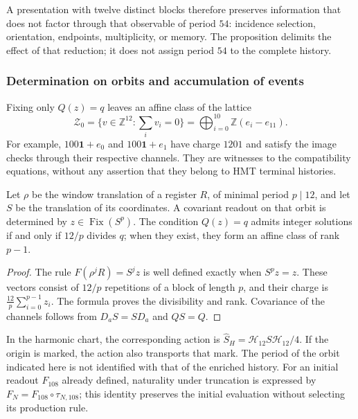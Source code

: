 A presentation with twelve distinct blocks therefore preserves
information that does not factor through that observable of period $54$:
incidence selection, orientation, endpoints, multiplicity, or
memory. The proposition delimits the effect of that reduction; it does
not assign period $54$ to the complete history.

\subsubsection{Determination on orbits and accumulation of events}

Fixing only $Q(z)=q$ leaves an affine class of the lattice
\[
 \mathcal Z_0=\{v\in\mathbb Z^{12}:\sum_i v_i=0\}
 =\bigoplus_{i=0}^{10}\mathbb Z(e_i-e_{11}).
\]
For example, $100\mathbf1+e_0$ and $100\mathbf1+e_1$ have
charge $1201$ and satisfy the image checks through their
respective channels. They are witnesses to the compatibility equations,
without any assertion that they belong to HMT terminal histories.

\begin{proposition}
\label{iii:r25:covariancia}
Let $\rho$ be the window translation of a register $R$, of
minimal period $p\mid12$, and let $S$ be the translation of its
coordinates. A covariant readout on that orbit is determined
by $z\in\operatorname{Fix}(S^p)$. The condition $Q(z)=q$
admits integer solutions if and only if $12/p$ divides $q$;
when they exist, they form an affine class of rank $p-1$.
\end{proposition}
\begin{proof}
The rule $F(\rho^jR)=S^jz$ is well defined exactly when
$S^pz=z$. These vectors consist of $12/p$ repetitions of a block of
length $p$, and their charge is $\frac{12}{p}\sum_{i=0}^{p-1}z_i$.
The formula proves the divisibility and rank. Covariance of
the channels follows from $D_aS=SD_a$ and $QS=Q$.
\end{proof}

In the harmonic chart, the corresponding action is
$\widehat S_H=\mathcal H_{12}S\mathcal H_{12}/4$.
If the origin is marked, the action also transports that mark.
The period of the orbit indicated here is not identified with that of
the enriched history. For an initial readout $F_{108}$ already
defined, naturality under truncation is expressed by
$F_N=F_{108}\circ\tau_{N,108}$; this identity preserves the
initial evaluation without selecting its production rule.

